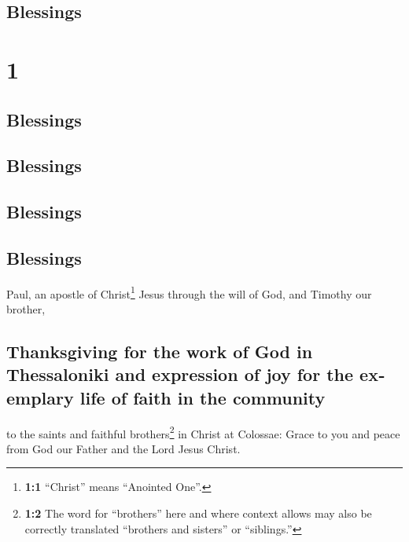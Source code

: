 \begin{paracol}{2}
\switchcolumn
\begin{otherlanguage}{english}

\hypertarget{blessings}{%
\subsection{Blessings}\label{blessings}}

\hypertarget{section-1}{%
\section{1}\label{section-1}}

\hypertarget{blessings-1}{%
\subsection{Blessings}\label{blessings-1}}

\hypertarget{blessings-2}{%
\subsection{Blessings}\label{blessings-2}}

\hypertarget{blessings-3}{%
\subsection{Blessings}\label{blessings-3}}

\hypertarget{blessings-4}{%
\subsection{Blessings}\label{blessings-4}}

 Paul, an apostle of Christ\footnote{\textbf{1:1}
  ``Christ'' means ``Anointed One''.} Jesus through the will of God, and
Timothy our brother,

\hypertarget{thanksgiving-for-the-work-of-god-in-thessaloniki-and-expression-of-joy-for-the-exemplary-life-of-faith-in-the-community}{%
\subsection{Thanksgiving for the work of God in Thessaloniki and
expression of joy for the exemplary life of faith in the
community}\label{thanksgiving-for-the-work-of-god-in-thessaloniki-and-expression-of-joy-for-the-exemplary-life-of-faith-in-the-community}}

 to the saints and faithful brothers\footnote{\textbf{1:2}
  The word for ``brothers'' here and where context allows may also be
  correctly translated ``brothers and sisters'' or ``siblings.''} in
Christ at Colossae: Grace to you and peace from God our Father and the
Lord Jesus Christ.


\end{otherlanguage}
\end{paracol}
